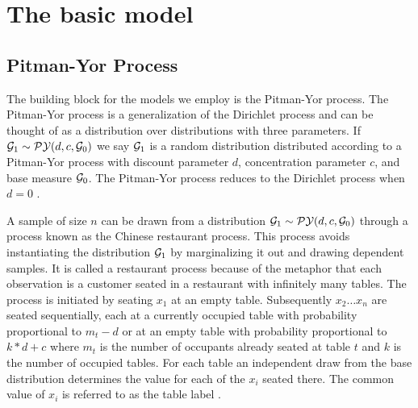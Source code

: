 
\section{The basic model}

\subsection{Pitman-Yor Process}

The building block for the models we employ is the Pitman-Yor process.  The Pitman-Yor process is a generalization of the Dirichlet process and can be thought of as a distribution over distributions with three parameters.  If $\G_1 \sim \PY(d,c,\G_0)$ we say $\G_1$ is a random distribution distributed according to a Pitman-Yor process with discount parameter $d$, concentration parameter $c$, and base measure $\G_0$. The Pitman-Yor process reduces to the Dirichlet process when $d = 0$ \cite{Pitman}.

A sample of size $n$ can be drawn from a distribution $\G_1\sim \PY(d,c,\G_0)$ through a process known as the Chinese restaurant process.  This process avoids instantiating the distribution $\G_1$ by marginalizing it out and drawing dependent samples.  It is called a restaurant process because of the metaphor that each observation is a customer seated in a restaurant with infinitely many tables. The process is initiated by seating $x_1$ at an empty table. Subsequently $x_2 \ldots x_n$ are seated sequentially, each at a currently occupied table with probability proportional to $m_t - d$ or at an empty table with probability proportional to $k*d + c$ where $m_t$ is the number of occupants already seated at table $t$ and $k$ is the number of occupied tables.  For each table an independent draw from the base distribution determines the value for each of the $x_i$ seated there.  The common value of $x_i$ is referred to as the table label \cite{mcqeen, pitman}.

